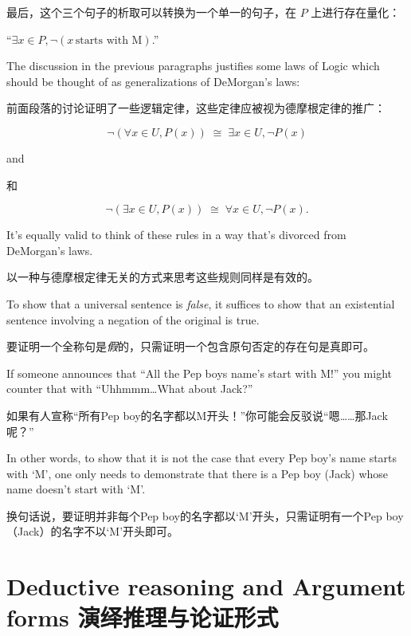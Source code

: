 \noindent 最后，这个三个句子的析取可以转换为一个单一的句子，在 $P$ 上进行存在量化：

``$\exists x \in P, {\lnot}(x \, \mbox{starts with M})$.'' 

The discussion in the previous paragraphs justifies some laws of 
Logic which should be thought of as generalizations of DeMorgan's laws:

前面段落的讨论证明了一些逻辑定律，这些定律应被视为德摩根定律的推广：

\[ 
{\lnot}( \forall x \in U, P(x)) \; \cong \; \exists x \in U, {\lnot}P(x)
\]

\noindent and

\noindent 和

\[ 
{\lnot}( \exists x \in U, P(x)) \; \cong \; \forall x \in U, {\lnot}P(x).
\]

It's equally valid to think of these rules in a way that's divorced from
DeMorgan's laws.

以一种与德摩根定律无关的方式来思考这些规则同样是有效的。

To show that a universal sentence is {\em false}, it suffices
to show that an existential sentence involving a negation of the original is 
true.

要证明一个全称句是{\em 假}的，只需证明一个包含原句否定的存在句是真即可。

If someone announces that ``All the Pep boys name's start with M!'' you might counter that
with ``Uhhmmm\ldots What about Jack?''

如果有人宣称“所有Pep boy的名字都以M开头！”你可能会反驳说“嗯……那Jack呢？”

In other words, to show that it is not the case that every Pep boy's name starts
with `M', one only needs to demonstrate that there is a Pep boy (Jack) whose 
name doesn't start with `M'.

换句话说，要证明并非每个Pep boy的名字都以‘M’开头，只需证明有一个Pep boy（Jack）的名字不以‘M’开头即可。

\clearpage





\newpage

\section{Deductive reasoning and Argument forms 演绎推理与论证形式}
\label{sec:deduct}


